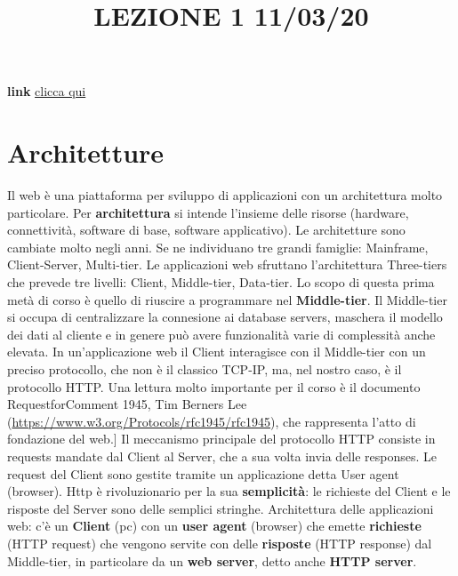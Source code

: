 \title{LEZIONE 1 11/03/20}\newline
\textbf{link} \href{https://web.microsoftstream.com/video/58568b1d-5fc5-41c0-88f6-608e4b8f9f7a}{clicca qui}
\section{Architetture}
Il web è una piattaforma per sviluppo di applicazioni con un architettura molto particolare. Per \textbf{architettura} si intende l'insieme delle risorse (hardware, connettività, software di base, software applicativo).\newline
\newline 
Le architetture sono  cambiate molto negli anni. Se ne individuano tre grandi famiglie: Mainframe, Client-Server, Multi-tier.\newline
Le applicazioni web sfruttano l'architettura Three-tiers che prevede tre livelli: Client, Middle-tier, Data-tier.\newline
Lo scopo di questa prima metà di corso è quello di riuscire a programmare nel \textbf{Middle-tier}. Il Middle-tier si occupa di centralizzare la connesione ai database servers, maschera il modello dei dati al cliente e in genere può avere funzionalità varie di complessità anche elevata.\newline
\newline
In un'applicazione web il Client interagisce con il Middle-tier con un preciso protocollo, che non è il classico TCP-IP, ma, nel nostro caso, è il protocollo HTTP.\newline
\newline
Una lettura molto importante per il corso è il documento RequestforComment 1945, Tim Berners Lee (\url{https://www.w3.org/Protocols/rfc1945/rfc1945}), che rappresenta l'atto di fondazione del web.]\newline
\newline
Il meccanismo principale del protocollo HTTP consiste in requests mandate dal Client al Server, che a sua volta invia delle responses. Le request del Client sono gestite tramite un applicazione detta User agent (browser).\newline
Http è rivoluzionario per la sua \textbf{semplicità}: le richieste del Client e le risposte del Server sono delle semplici stringhe. \newline
\newline
Architettura delle applicazioni web: c'è un \textbf{Client} (pc) con un \textbf{user agent} (browser) che emette \textbf{richieste} (HTTP request) che vengono servite con delle \textbf{risposte} (HTTP response) dal Middle-tier, in particolare da un \textbf{web server}, detto anche \textbf{HTTP server}.\newline
